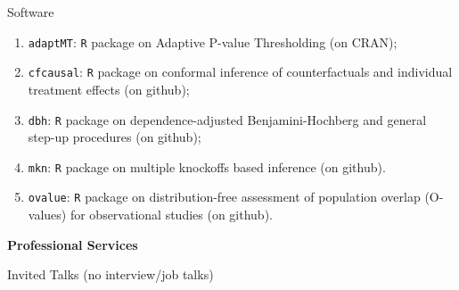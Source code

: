 \documentclass{article}
\begin{document}
\begin{large}
\noindent Software
\end{large}

\begin{enumerate}
\item \texttt{adaptMT}: \texttt{R} package on Adaptive P-value Thresholding (on CRAN);
\item \texttt{cfcausal}: \texttt{R} package on conformal inference of counterfactuals and individual treatment effects (on github);
\item \texttt{dbh}: \texttt{R} package on dependence-adjusted Benjamini-Hochberg and general step-up procedures (on github);
\item \texttt{mkn}: \texttt{R} package on multiple knockoffs based inference (on github).
\item \texttt{ovalue}: \texttt{R} package on distribution-free assessment of population overlap (O-values) for observational studies (on github).
\end{enumerate}

\vspace{5mm}
\begin{large}
\noindent \textbf{Professional Services}
\end{large}
\vspace{5mm}

\begin{large}
\noindent Invited Talks (no interview/job talks)
\end{large}
\end{document}
